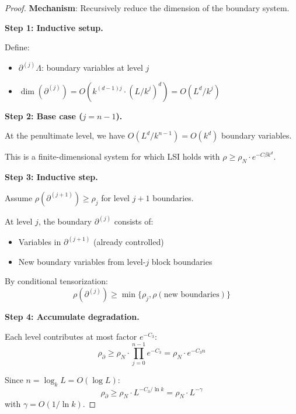 \begin{proof}
\textbf{Mechanism}: Recursively reduce the dimension of the boundary system.

\textbf{Step 1: Inductive setup.}

Define:
\begin{itemize}
\item $\partial^{(j)} \Lambda$: boundary variables at level $j$
\item $\dim(\partial^{(j)}) = O(k^{(d-1)j} \cdot (L/k^j)^d) = O(L^d / k^j)$
\end{itemize}

\textbf{Step 2: Base case ($j = n-1$).}

At the penultimate level, we have $O(L^d/k^{n-1}) = O(k^d)$ boundary variables.

This is a finite-dimensional system for which LSI holds with $\rho \geq \rho_N \cdot e^{-C\beta k^d}$.

\textbf{Step 3: Inductive step.}

Assume $\rho(\partial^{(j+1)}) \geq \rho_j$ for level $j+1$ boundaries.

At level $j$, the boundary $\partial^{(j)}$ consists of:
\begin{itemize}
\item Variables in $\partial^{(j+1)}$ (already controlled)
\item New boundary variables from level-$j$ block boundaries
\end{itemize}

By conditional tensorization:
\begin{equation}
\rho(\partial^{(j)}) \geq \min\{\rho_j, \rho(\text{new boundaries})\}
\end{equation}

\textbf{Step 4: Accumulate degradation.}

Each level contributes at most factor $e^{-C_3}$:
\begin{equation}
\rho_{\partial} \geq \rho_N \cdot \prod_{j=0}^{n-1} e^{-C_3} = \rho_N \cdot e^{-C_3 n}
\end{equation}

Since $n = \log_k L = O(\log L)$:
\begin{equation}
\rho_{\partial} \geq \rho_N \cdot L^{-C_3 / \ln k} = \rho_N \cdot L^{-\gamma}
\end{equation}
with $\gamma = O(1/\ln k)$.
\end{proof}

